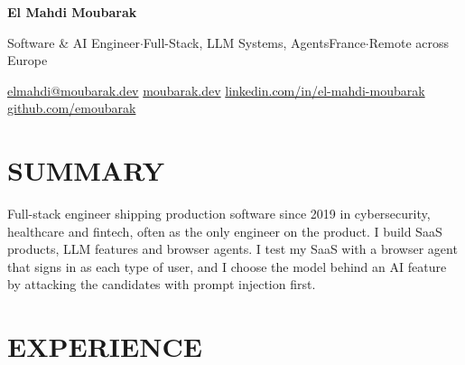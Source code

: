 \documentclass[a4paper,10pt]{article}
\newcommand{\sep}{\unskip\nobreak\hspace{0.45em}{\color{muted}$\cdot$}\hspace{0.45em}\ignorespaces}
\newcommand{\contact}[2]{\href{#1}{\color{onband}#2}}
\begin{document}
%
\vspace*{-1pt}%
{\fontsize{27}{32}\selectfont\bfseries\color{white} El Mahdi Moubarak}\par\vspace{5pt}
{\large\color{accentlight} Software \& AI Engineer{\color{onband}\enspace$\cdot$\enspace}Full-Stack, LLM Systems, Agents}\hfill{\color{onband}France\enspace$\cdot$\enspace Remote across Europe}\par\vspace{7pt}
{\fontsize{10}{13}\selectfont\color{onband}\contact{mailto:elmahdi@moubarak.dev}{elmahdi@moubarak.dev}\sep
\contact{https://moubarak.dev}{moubarak.dev}\sep
\contact{https://www.linkedin.com/in/el-mahdi-moubarak}{linkedin.com/in/el-mahdi-moubarak}\sep
\contact{https://github.com/emoubarak}{github.com/emoubarak}}\par
\vspace{20pt}

\section*{SUMMARY}
Full-stack engineer shipping production software since 2019 in cybersecurity, healthcare and fintech, often as the only engineer on the product. I build SaaS products, LLM features and browser agents. I test my SaaS with a browser agent that signs in as each type of user, and I choose the model behind an AI feature by attacking the candidates with prompt injection first.

\section*{EXPERIENCE}
\end{document}
